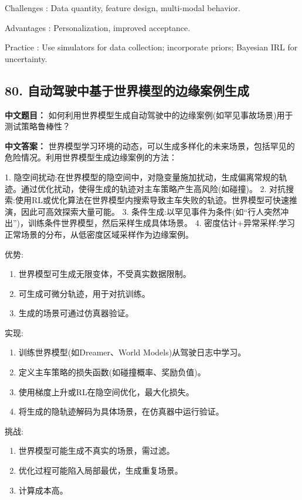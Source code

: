 \documentclass[10pt,a4paper]{ctexart}
\begin{document}
 Challenges : Data quantity, feature design, multi-modal behavior.

 Advantages : Personalization, improved acceptance.

 Practice : Use simulators for data collection; incorporate priors; Bayesian IRL for uncertainty.

\subsection*{80. 自动驾驶中基于世界模型的边缘案例生成}
\textbf{中文题目：} 如何利用世界模型生成自动驾驶中的边缘案例(如罕见事故场景)用于测试策略鲁棒性？

\textbf{中文答案：}  
世界模型学习环境的动态，可以生成多样化的未来场景，包括罕见的危险情况。利用世界模型生成边缘案例的方法：

1.  隐空间扰动:在世界模型的隐空间中，对隐变量施加扰动，生成偏离常规的轨迹。通过优化扰动，使得生成的轨迹对主车策略产生高风险(如碰撞)。
2.  对抗搜索:使用RL或优化算法在世界模型内搜索导致主车失败的轨迹。世界模型可快速推演，因此可高效探索大量可能。
3.  条件生成:以罕见事件为条件(如“行人突然冲出”)，训练条件世界模型，然后采样生成具体场景。
4.  密度估计+异常采样:学习正常场景的分布，从低密度区域采样作为边缘案例。

 优势:
\begin{enumerate}
    \item 世界模型可生成无限变体，不受真实数据限制。
    \item 可生成可微分轨迹，用于对抗训练。
    \item 生成的场景可通过仿真器验证。
\end{enumerate}

 实现:
\begin{enumerate}
    \item 训练世界模型(如Dreamer、World Models)从驾驶日志中学习。
    \item 定义主车策略的损失函数(如碰撞概率、奖励负值)。
    \item 使用梯度上升或RL在隐空间优化，最大化损失。
    \item 将生成的隐轨迹解码为具体场景，在仿真器中运行验证。
\end{enumerate}

 挑战:
\begin{enumerate}
    \item 世界模型可能生成不真实的场景，需过滤。
    \item 优化过程可能陷入局部最优，生成重复场景。
    \item 计算成本高。
\end{enumerate}
\end{document}
